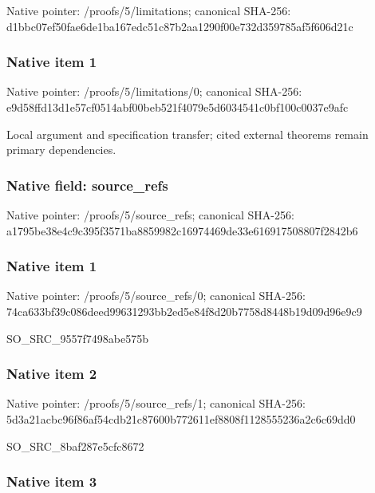 \documentclass[10pt,a4paper]{article}
\begin{document}
Native pointer: /proofs/5/limitations; canonical SHA-256: d1bbc07ef50fae6de1ba167e\allowbreak{}dc51c87b2aa1290f00e732d3\allowbreak{}59785af5f606d21c



\subsubsection{Native item 1}


Native pointer: /proofs/5/limitations/0; canonical SHA-256: e9d58ffd13d1e57cf0514abf\allowbreak{}00beb521f4079e5d6034541c\allowbreak{}0bf100c0037e9afc


Local argument and specification transfer; cited external theorems remain primary dependencies.


\subsubsection{Native field: source\_refs}


Native pointer: /proofs/5/source\_refs; canonical SHA-256: a1795be38e4c9c395f3571ba\allowbreak{}8859982c16974469de33e616\allowbreak{}917508807f2842b6



\subsubsection{Native item 1}


Native pointer: /proofs/5/source\_refs/0; canonical SHA-256: 74ca633bf39c086deed99631\allowbreak{}293bb2ed5e84f8d20b7758d8\allowbreak{}448b19d09d96e9c9


SO\_SRC\_9557f7498abe575b


\subsubsection{Native item 2}


Native pointer: /proofs/5/source\_refs/1; canonical SHA-256: 5d3a21acbc96f86af54cdb21\allowbreak{}c87600b772611ef8808f1128\allowbreak{}555236a2c6c69dd0


SO\_SRC\_8baf287e5cfc8672


\subsubsection{Native item 3}
\end{document}
